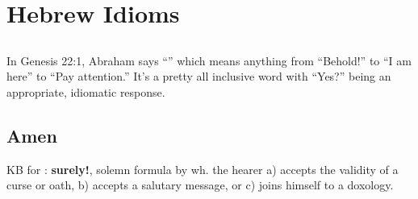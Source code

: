 \chapter{Hebrew Idioms}\label{app:idioms}
\section{}
In Genesis 22:1, Abraham says ``'' which means anything from ``Behold!'' to ``I am here'' to ``Pay attention.'' It's a pretty all inclusive word with ``Yes?'' being an appropriate, idiomatic response.

\section{Amen}
KB for : \textbf{surely!}, solemn formula by wh\@. the hearer a) accepts the validity of a curse or oath, b) accepts a salutary message, or c) joins himself to a doxology.
